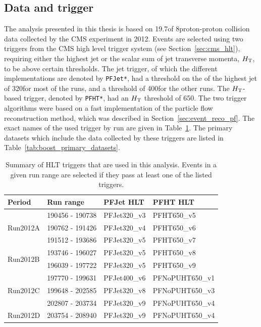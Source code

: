 
\subsection{Data and trigger \label{sec:boost_data_trigger}}

The analysis presented in this thesis is based on 19.7\fbinv of 8\TeV proton-proton collision data
collected by the CMS experiment in 2012.  Events are selected using two triggers from the CMS high
level trigger system (see Section~\ref{sec:cms_hlt}), requiring either the highest jet \pt or the
scalar sum of jet transverse momenta, $H_{\mathrm{T}} $, to be above certain thresholds. 
The jet \pt trigger, of which the different implementations are denoted by \texttt{PFJet*},
had a threshold on the \pt of the highest \pt jet of 320\GeV for most of the runs, and a threshold
of 400\GeV for the other runs. 
The $H_{\mathrm{T}} $-based trigger, denoted by \texttt{PFHT*}, had an $H_{\mathrm{T}} $ threshold of 650\GeV. 
The two trigger algorithms were based on a fast implementation of the particle flow 
reconstruction method, which was described in Section~\ref{sec:event_reco_pf}.  
The exact names of the used trigger by run are given in Table~\ref{tab:boost_triggers}. The primary
datasets which include the data collected by these triggers are listed in
Table~\ref{tab:boost_primary_datasets}. 

\begin{table}[htdp]
\caption{Summary of HLT triggers that are used in this analysis. Events in a given run range
are selected if they pass at least one of the listed triggers. }	
\begin{center}
\begin{tabular}{l l l l}
\toprule
Period & Run range & PFJet HLT & PFHT HLT \\
\midrule
\multirow{3}{*}{Run2012A} & 190456 - 190738 & PFJet320\_v3 & PFHT650\_v5 \\
& 190762 - 191426 & PFJet320\_v4 & PFHT650\_v6 \\
& 191512 - 193686 & PFJet320\_v5 & PFHT650\_v7 \\
\midrule
\multirow{2}{*}{Run2012B} & 193746 - 196027 & PFJet320\_v5 & PFHT650\_v8 \\
& 196039 - 197722 & PFJet320\_v5 & PFHT650\_v9 \\
\midrule
\multirow{3}{*}{Run2012C} & 197770 - 199631 & PFJet400\_v6 & PFNoPUHT650\_v1 \\
& 199648 - 202585 & PFJet320\_v8 & PFNoPUHT650\_v3 \\
& 202807 - 203734 & PFJet320\_v9 & PFNoPUHT650\_v4 \\
\midrule
Run2012D & 203754 - 208940 & PFJet320\_v9 & PFNoPUHT650\_v4 \\
\bottomrule
\end{tabular}
\end{center}
\label{tab:boost_triggers}
\end{table}

